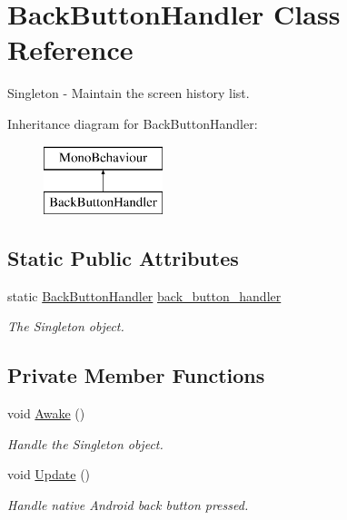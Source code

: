 \hypertarget{class_back_button_handler}{}\section{Back\+Button\+Handler Class Reference}
\label{class_back_button_handler}


Singleton -\/ Maintain the screen history list.  


Inheritance diagram for Back\+Button\+Handler\+:\begin{figure}[H]
\begin{center}
\leavevmode
\includegraphics[height=2.000000cm]{class_back_button_handler}
\end{center}
\end{figure}
\subsection*{Static Public Attributes}
\begin{DoxyCompactItemize}
\item 
\mbox{\label{class_back_button_handler_a6fd6f32fc652c5be872ebdeef591ecfe}} 
static \mbox{\hyperlink{class_back_button_handler}{Back\+Button\+Handler}} \mbox{\hyperlink{class_back_button_handler_a6fd6f32fc652c5be872ebdeef591ecfe}{back\+\_\+button\+\_\+handler}}
\begin{DoxyCompactList}\small\item\em The Singleton object. \end{DoxyCompactList}\end{DoxyCompactItemize}
\subsection*{Private Member Functions}
\begin{DoxyCompactItemize}
\item 
\mbox{\label{class_back_button_handler_ac35dc3235b4f8a0b86645237b2490ace}} 
void \mbox{\hyperlink{class_back_button_handler_ac35dc3235b4f8a0b86645237b2490ace}{Awake}} ()
\begin{DoxyCompactList}\small\item\em Handle the Singleton object. \end{DoxyCompactList}\item 
\mbox{\label{class_back_button_handler_a35b84c30f2f379a6722cef7d347eaf80}} 
void \mbox{\hyperlink{class_back_button_handler_a35b84c30f2f379a6722cef7d347eaf80}{Update}} ()
\begin{DoxyCompactList}\small\item\em Handle native Android back button pressed. \end{DoxyCompactList}\end{DoxyCompactItemize}


